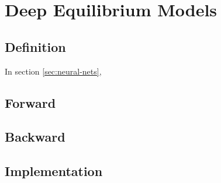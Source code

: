 \chapter{Deep Equilibrium Models}\label{ch:deq}

\section{Definition}

In section \ref{sec:neural-nets}, 

\section{Forward}

\section{Backward}

\section{Implementation}

